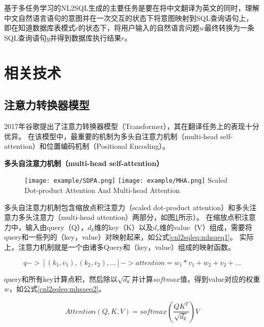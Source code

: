 基于多任务学习的NL2SQL生成的主要任务是要在将中文翻译为英文的同时，理解中文自然语言语句的意图并在一次交互的状态下将意图映射到SQL查询语句上，
即在知道数据库表模式$c$的状态下，将用户输入的自然语言问题$w$最终转换为一条SQL查询语句$y$并得到数据库执行结果$r$。

\section{相关技术}
\subsection{注意力转换器模型}

2017年谷歌提出了注意力转换器模型（Transformer）\cite{vaswani2017attention}，其在翻译任务上的表现十分优异。
在该模型中，最重要的机制为多头自注意力机制（multi-head self-attention）和位置编码机制（Positional Encoding）。

\textbf{多头自注意力机制（multi-head self-attention）}

\begin{figure}[!htp]
  \centering
  \texttt{[image: example/SDPA.png]}
  \texttt{[image: example/MHA.png]}
    {Scaled Dot-product Attention And Multi-head Attention}
  \label{fig:SDPAMHA}
\end{figure}

多头自注意力机制包含缩放点积注意力（scaled dot-product attention）和多头注意力多头注意力（multi-head attention）两部分，如图\ref{fig:SDPAMHA}所示）。
在缩放点积注意力中，输入由query（Q），$d_k$维的key（K）以及$d_v$维的value（V）组成，需要将query和一些列的（key，value）对映射起来，如公式\ref{cnl2sqleq:mhsaeq1}。
实际上，注意力机制就是一个由诸多Query和（key，value）组成的映射函数。

\begin{equation}
  \label{cnl2sqleq:mhsaeq1}
  q -> [(k_1,v_1),(k_2,v_2),...] -> attention = w_1 * v_1 + w_2 +v_2 + ... 
\end{equation}

query和所有key计算点积，然后除以$\sqrt{d_k}$并计算$softmax$值，得到value对应的权重$w$，如公式\ref{cnl2sqleq:mhsaeq2}。

\begin{equation}
  \label{cnl2sqleq:mhsaeq2}
  Attention(Q,K,V) = softmax(\frac{QK^T}{\sqrt{d_k}})V  
\end{equation}

